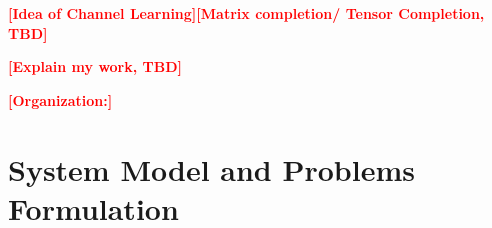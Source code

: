 \documentclass[12pt, draftcls, onecolumn]{IEEEtran}
\theoremstyle{plain}
\theoremstyle{definition}
\theoremstyle{remark}
\newcommand{\nt}[1]{\textcolor{red}{\textbf{[#1]}}}
\begin{document}
\nt{Idea of Channel Learning}\nt{Matrix completion/ Tensor Completion, TBD}


\nt{Explain my work, TBD}%





\nt{Organization:}

\section{System Model and Problems Formulation}
\end{document}
